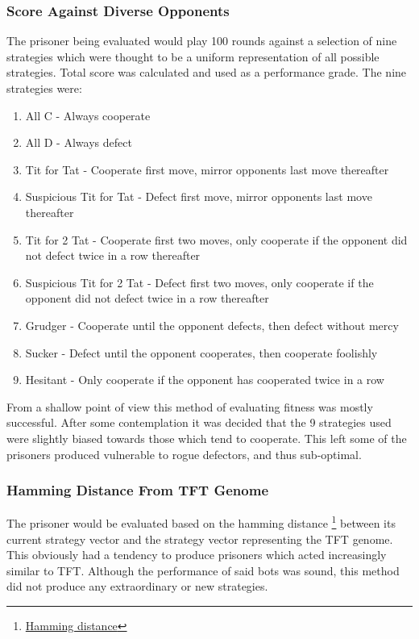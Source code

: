 \documentclass[12pt]{article}
\begin{document}
\subsubsection{Score Against Diverse Opponents}
The prisoner being evaluated would play 100 rounds against a selection of nine
strategies which were thought to be a uniform representation of all possible
strategies.  Total score was calculated and used as a performance grade.
The nine strategies were:
\begin{enumerate}
    \item All C - Always cooperate
    \item All D - Always defect
    \item Tit for Tat - Cooperate first move, mirror opponents last move thereafter
    \item Suspicious Tit for Tat - Defect first move, mirror opponents last move
        thereafter
    \item Tit for 2 Tat - Cooperate first two moves, only cooperate if the
        opponent did not defect twice in a row thereafter
    \item Suspicious Tit for 2 Tat - Defect first two moves, only cooperate if the
        opponent did not defect twice in a row thereafter
    \item Grudger - Cooperate until the opponent defects, then defect without mercy
    \item Sucker - Defect until the opponent cooperates, then cooperate foolishly
    \item Hesitant - Only cooperate if the opponent has cooperated twice in a row
\end{enumerate}

From a shallow point of view this method of evaluating fitness was mostly
successful.  After some contemplation it was decided that the
9 strategies used were slightly biased towards those which tend to cooperate.
This left some of the prisoners produced vulnerable to rogue defectors,
and thus sub-optimal.

\subsubsection{Hamming Distance From TFT Genome}
The prisoner would be evaluated based on the hamming distance
\footnote
{\href{https://en.wikipedia.org/wiki/Hamming distance}{Hamming distance}}
between its current strategy vector and the strategy vector representing
the TFT genome.  This obviously had a tendency to produce prisoners which
acted increasingly similar to TFT.  Although the performance of said bots
was sound, this method did not produce any extraordinary or new strategies.
\end{document}
